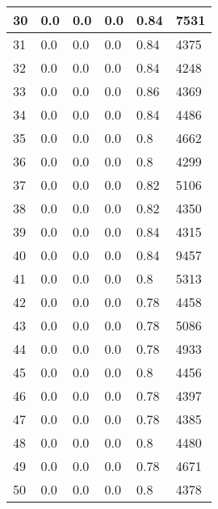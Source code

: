 \begin{longtable}{|l|l|l|l|l|l|}
30 & 0.0 & 0.0 & 0.0 & 0.84 & 7531 \\ \hline 
31 & 0.0 & 0.0 & 0.0 & 0.84 & 4375 \\ \hline 
32 & 0.0 & 0.0 & 0.0 & 0.84 & 4248 \\ \hline 
33 & 0.0 & 0.0 & 0.0 & 0.86 & 4369 \\ \hline 
34 & 0.0 & 0.0 & 0.0 & 0.84 & 4486 \\ \hline 
35 & 0.0 & 0.0 & 0.0 & 0.8 & 4662 \\ \hline 
36 & 0.0 & 0.0 & 0.0 & 0.8 & 4299 \\ \hline 
37 & 0.0 & 0.0 & 0.0 & 0.82 & 5106 \\ \hline 
38 & 0.0 & 0.0 & 0.0 & 0.82 & 4350 \\ \hline 
39 & 0.0 & 0.0 & 0.0 & 0.84 & 4315 \\ \hline 
40 & 0.0 & 0.0 & 0.0 & 0.84 & 9457 \\ \hline 
41 & 0.0 & 0.0 & 0.0 & 0.8 & 5313 \\ \hline 
42 & 0.0 & 0.0 & 0.0 & 0.78 & 4458 \\ \hline 
43 & 0.0 & 0.0 & 0.0 & 0.78 & 5086 \\ \hline 
44 & 0.0 & 0.0 & 0.0 & 0.78 & 4933 \\ \hline 
45 & 0.0 & 0.0 & 0.0 & 0.8 & 4456 \\ \hline 
46 & 0.0 & 0.0 & 0.0 & 0.78 & 4397 \\ \hline 
47 & 0.0 & 0.0 & 0.0 & 0.78 & 4385 \\ \hline 
48 & 0.0 & 0.0 & 0.0 & 0.8 & 4480 \\ \hline 
49 & 0.0 & 0.0 & 0.0 & 0.78 & 4671 \\ \hline 
50 & 0.0 & 0.0 & 0.0 & 0.8 & 4378 \\ \hline 
\end{longtable}